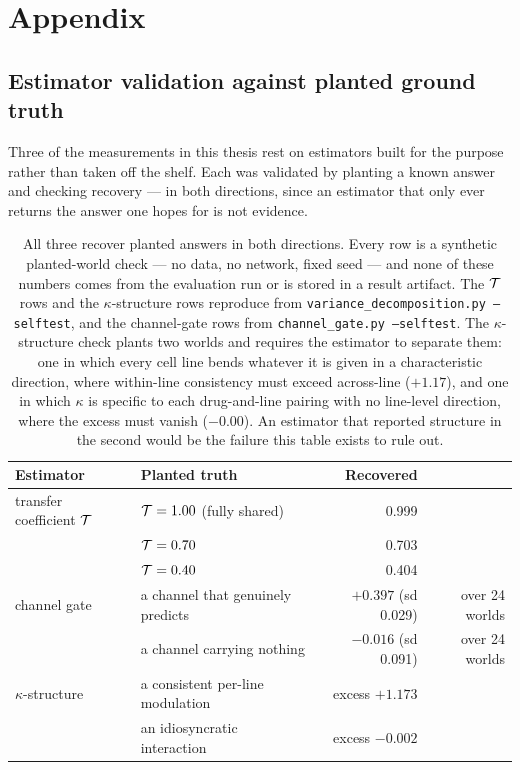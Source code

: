 \appendix
\section{Appendix}
\label{sec:appendix}

\subsection{Estimator validation against planted ground truth}
\label{sec:app-planted}

Three of the measurements in this thesis rest on estimators built for the purpose rather than taken
off the shelf. Each was validated by planting a known answer and checking recovery --- in both
directions, since an estimator that only ever returns the answer one hopes for is not evidence.

\begin{table}[htbp]
\centering
\footnotesize
\begin{tabular}{llrr}
\toprule
Estimator & Planted truth & Recovered & \\
\midrule
transfer coefficient $\mathcal{T}$ & $\mathcal{T} = 1.00$ (fully shared) & 0.999 & \\
 & $\mathcal{T} = 0.70$ & 0.703 & \\
 & $\mathcal{T} = 0.40$ & 0.404 & \\
\midrule
channel gate & a channel that genuinely predicts & $+0.397$ (sd 0.029) & over 24 worlds \\
 & a channel carrying nothing & $-0.016$ (sd 0.091) & over 24 worlds \\
\midrule
$\kappa$-structure & a consistent per-line modulation & excess $+1.173$ & \\
 & an idiosyncratic interaction & excess $-0.002$ & \\
\bottomrule
\end{tabular}
\caption{All three recover planted answers in both directions. Every row is a synthetic planted-world
check --- no data, no network, fixed seed --- and none of these numbers comes from the evaluation
run or is stored in a result artifact. The $\mathcal{T}$ rows and the
$\kappa$-structure rows reproduce from \texttt{variance\_decomposition.py --selftest}, and the
channel-gate rows from \texttt{channel\_gate.py --selftest}. The $\kappa$-structure check plants two
worlds and requires the estimator to separate them: one in which every cell line bends whatever it
is given in a characteristic direction, where within-line consistency must exceed across-line
($+1.17$), and one in which $\kappa$ is specific to each drug-and-line pairing with no line-level
direction, where the excess must vanish ($-0.00$). An estimator that reported structure in the
second would be the failure this table exists to rule out.}
\label{tab:planted}
\end{table}

